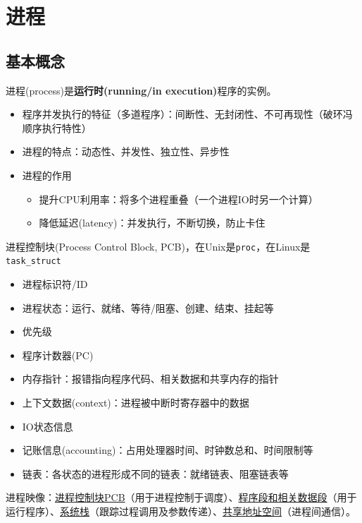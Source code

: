 
\section{进程}
\subsection{基本概念}
进程(process)是\textbf{运行时(running/in execution)}程序的实例。
\begin{itemize}
	\item 程序并发执行的特征（多道程序）：间断性、无封闭性、不可再现性（破环冯顺序执行特性）
	\item 进程的特点：动态性、并发性、独立性、异步性
	\item 进程的作用
	\begin{itemize}
		\item 提升CPU利用率：将多个进程重叠（一个进程IO时另一个计算）
		\item 降低延迟(latency)：并发执行，不断切换，防止卡住
	\end{itemize}
\end{itemize}

进程控制块(Process Control Block, PCB)，在Unix是\verb'proc'，在Linux是\verb'task_struct'
\begin{itemize}
	\item 进程标识符/ID
	\item 进程状态：运行、就绪、等待/阻塞、创建、结束、挂起等
	\item 优先级
	\item 程序计数器(PC)
	\item 内存指针：报错指向程序代码、相关数据和共享内存的指针
	\item 上下文数据(context)：进程被中断时寄存器中的数据
	\item IO状态信息
	\item 记账信息(accounting)：占用处理器时间、时钟数总和、时间限制等
	\item 链表：各状态的进程形成不同的链表：就绪链表、阻塞链表等
\end{itemize}

进程映像：\underline{进程控制块PCB}（用于进程控制于调度）、\underline{程序段和相关数据段}（用于运行程序）、\underline{系统栈}（跟踪过程调用及参数传递）、\underline{共享地址空间}（进程间通信）。

